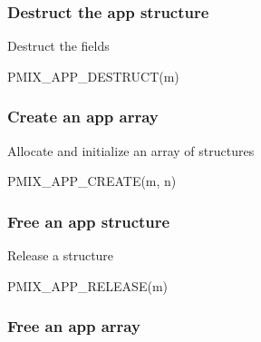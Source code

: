 \subsubsection{Destruct the app structure}

Destruct the  fields

\cspecificstart
\begin{codepar}
PMIX_APP_DESTRUCT(m)
\end{codepar}
\cspecificend

\begin{arglist}
\end{arglist}

\subsubsection{Create an app array}

Allocate and initialize an array of  structures

\cspecificstart
\begin{codepar}
PMIX_APP_CREATE(m, n)
\end{codepar}
\cspecificend

\begin{arglist}
\end{arglist}


\subsubsection{Free an app structure}

Release a  structure

\cspecificstart
\begin{codepar}
PMIX_APP_RELEASE(m)
\end{codepar}
\cspecificend

\begin{arglist}
\end{arglist}

\subsubsection{Free an app array}

